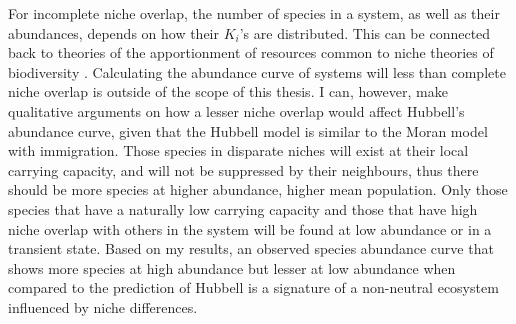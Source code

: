 For incomplete niche overlap, the number of species in a system, as well as their abundances, depends on how their $K_i$'s are distributed. 
This can be connected back to theories of the apportionment of resources common to niche theories of biodiversity \cite{MacArthur1957,Sugihara2003,Leibold1995}. 
Calculating the abundance curve of systems will less than complete niche overlap is outside of the scope of this thesis. 
I can, however, make qualitative arguments on how a lesser niche overlap would affect Hubbell's abundance curve, given that the Hubbell model is similar to the Moran model with immigration. 
Those species in disparate niches will exist at their local carrying capacity, and will not be suppressed by their neighbours, thus there should be more species at higher abundance, higher mean population. 
Only those species that have a naturally low carrying capacity and those that have high niche overlap with others in the system will be found at low abundance or in a transient state. 
Based on my results, an observed species abundance curve that shows more species at high abundance but lesser at low abundance when compared to the prediction of Hubbell is a signature of a non-neutral ecosystem influenced by niche differences. 
